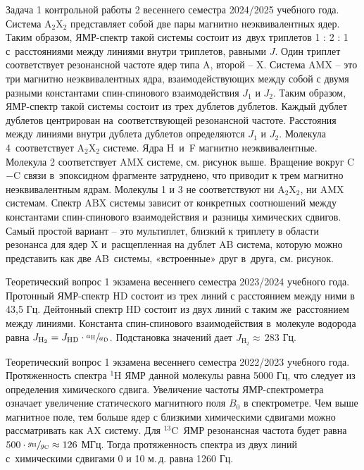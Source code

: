  Задача 1 контрольной работы 2 весеннего семестра 2024/2025 учебного года. Система $\text{A}_2\text{X}_2$ представляет собой две пары магнитно неэквивалентных ядер. Таким образом, ЯМР-спектр такой системы состоит из~двух триплетов 1 : 2 : 1 с~расстояниями между линиями внутри триплетов, равными $J$. Один триплет соответствует резонансной частоте ядер типа A, второй – X. Система $\text{AMX}$ – это три магнитно неэквивалентных ядра, взаимодействующих между собой с двумя разными константами спин-спинового взаимодействия $J_1$ и $J_2$. Таким образом, ЯМР-спектр такой системы состоит из трех дублетов дублетов. Каждый дублет дублетов центрирован на~соответствующей резонансной частоте. Расстояния между линиями внутри дублета дублетов определяются $J_1$ и $J_2$. Молекула 4~соответствует $\text{A}_2\text{X}_2$ системе. Ядра H~и~F магнитно неэквивалентные. Молекула 2 соответствует $\text{AMX}$ системе, см. рисунок выше. Вращение вокруг C$-$C связи в~эпоксидном фрагменте затруднено, что приводит к трем магнитно неэквивалентным ядрам. Молекулы 1 и 3 не соответствуют ни $\text{A}_2\text{X}_2$, ни $\text{AMX}$ системам. Спектр $\text{ABX}$ системы зависит от конкретных соотношений между константами спин-спинового взаимодействия и~разницы химических сдвигов. Самый простой вариант – это мультиплет, близкий к триплету в области резонанса для ядер X и~расщепленная на дублет AB система, которую можно представить как две AB~системы, «встроенные» друг в~друга, см. рисунок.\par
{} Теоретический вопрос 1 экзамена весеннего семестра 2023/2024 учебного года. Протонный ЯМР-спектр $\text{HD}$ состоит из трех линий с расстоянием между ними в 43,5 Гц. Дейтонный спектр $\text{HD}$ состоит из двух линий с таким же~расстоянием между линиями. Константа спин-спинового взаимодействия в~молекуле водорода равна $J_{\text{H}_2}=J_{\text{HD}} \cdot \sfrac{a_\text{H}}{a_\text{D}}$. Подстановка значений дает $J_{\text{H}_2} \approx\,$283 Гц.\par
{} Теоретический вопрос 1 экзамена весеннего семестра 2022/2023 учебного года. Протяженность спектра $^1\text{H}$ ЯМР данной молекулы равна 5000 Гц, что следует из определения химического сдвига. Увеличение частоты ЯМР-спектрометра означает увеличение статического магнитного поля $B_0$ в спектрометре. Чем выше магнитное поле, тем больше ядер с близкими химическими сдвигами можно рассматривать как $\text{AX}$ систему. Для $^{13}\text{C}$~ЯМР резонансная частота будет равна $500 \cdot \sfrac{g_\text{H}}{g_\text{C}} \approx 126$ МГц. Тогда протяженность спектра из двух линий с~химическими сдвигами 0 и 10 м.\,д. равна 1260 Гц.\par
